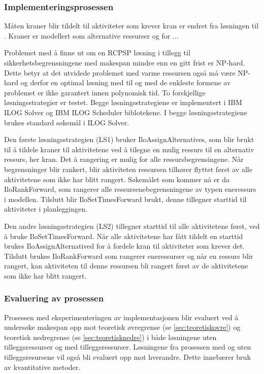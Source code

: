 \subsubsection{Implementeringsprosessen}
Måten kraner blir tildelt til aktiviteter som krever kran er endret fra løsningen til \bht. Kraner er modellert som alternative ressurser og for ...

Problemet med å finne ut om en RCPSP løsning i tillegg til sikkerhetsbegrensningene med makespan mindre enn en gitt frist er NP-hard. Dette betyr at det utvidede problemet med varme ressursen også må være NP-hard og derfor en optimal løsning med til og med de enkleste formene av problemet er ikke garantert innen polynomisk tid. To forskjellige løsningsstrategier er testet. Begge løsningsstrategiene er implementert i IBM ILOG Solver og IBM ILOG Scheduler biblotekene. I begge løsningsstrategiene brukes standard søkemål i ILOG Solver.

Den første løsningsstrategien (LS1) bruker IloAssignAlternatives, som blir brukt til å tildele kraner til aktivitetene ved å tilegne en mulig ressurs til en alternativ ressurs, her kran. Det å rangering er mulig for alle ressursbegrensingene. Når begrensninger blir rankert, blir aktiviteten ressursen tilhører flyttet først av alle aktivitetene som ikke har blitt rangert. Søkemålet som kommer nå er da IloRankForward, som rangerer alle ressursenebegrensningene av typen eneressurs i modellen. Tilslutt blir IloSetTimesForward brukt, denne tillegner starttid til aktiviteter i planleggingen.

Den andre løsningsstrategien (LS2) tillegner starttid til alle aktivitetene først, ved å bruke IloSetTimesForward. Når alle aktivitetene har fått tildelt en starttid brukes IloAssignAlternatived for å fordele kran til aktiviteter som krever det. Tilslutt brukes IloRankForward som rangerer eneressurser og når en ressurs blir rangert, kan aktiviteten til denne ressursen bli rangert først av de aktivitetene som ikke har blitt rangert.

\subsubsection{Evaluering av prosessen}
Prosessen med eksperimenteringen av implementasjonen blir evaluert ved å undersøke makespan opp mot teoretisk øvregrense (se \ref{sec:teoretiskovre}) og teoretisk nedregrense (se \ref{sec:teoretisknedre}) i både løsningene uten tilleggsressurser og med tilleggsressurser. Løsningene fra prosessen med og uten tilleggsresursene vil også bli evaluert opp mot hverandre. Dette innebærer bruk av kvantitative metoder.

